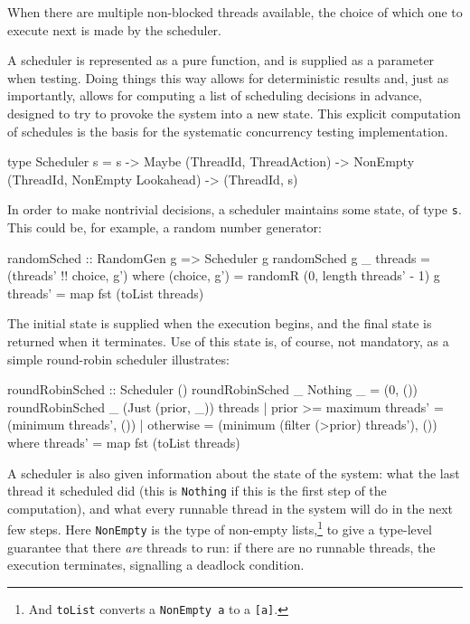 When there are multiple non-blocked threads available, the choice of
which one to execute next is made by the scheduler.

A scheduler is represented as a pure function, and is supplied as a
parameter when testing. Doing things this way allows for deterministic
results and, just as importantly, allows for computing a list of
scheduling decisions in advance, designed to try to provoke the system
into a new state. This explicit computation of schedules is the basis
for the systematic concurrency testing implementation.

\begin{haskellcode}
type Scheduler s = s
  -> Maybe (ThreadId, ThreadAction)
  -> NonEmpty (ThreadId, NonEmpty Lookahead)
  -> (ThreadId, s)
\end{haskellcode}

In order to make nontrivial decisions, a scheduler maintains some
state, of type \verb|s|. This could be, for example, a random number
generator:

\begin{haskellcode}
randomSched :: RandomGen g => Scheduler g
randomSched g _ threads = (threads' !! choice, g') where
  (choice, g') = randomR (0, length threads' - 1) g
  threads'     = map fst (toList threads)
\end{haskellcode}

The initial state is supplied when the execution begins, and the final
state is returned when it terminates. Use of this state is, of course,
not mandatory, as a simple round-robin scheduler illustrates:

\begin{haskellcode}
roundRobinSched :: Scheduler ()
roundRobinSched _ Nothing _ = (0, ())
roundRobinSched _ (Just (prior, _)) threads
  | prior >= maximum threads' = (minimum threads', ())
  | otherwise = (minimum (filter (>prior) threads'), ())
  where threads' = map fst (toList threads)
\end{haskellcode}

A scheduler is also given information about the state of the system:
what the last thread it scheduled did (this is \verb|Nothing| if this
is the first step of the computation), and what every runnable thread
in the system will do in the next few steps. Here \verb|NonEmpty| is
the type of non-empty lists,\footnote{And \texttt{toList} converts a
  \texttt{NonEmpty a} to a \texttt{[a]}.} to give a type-level
guarantee that there \emph{are} threads to run: if there are no
runnable threads, the execution terminates, signalling a deadlock
condition.

